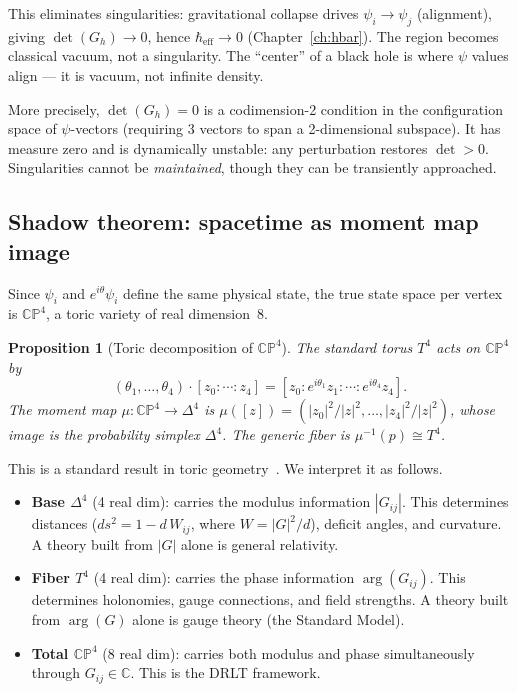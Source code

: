 \documentclass[12pt]{article}
\newtheorem{proposition}[theorem]{Proposition}
\theoremstyle{remark}
\theoremstyle{definition}
\begin{document}
This eliminates singularities: gravitational collapse drives $\psi_i \to \psi_j$ (alignment), giving $\det(G_h) \to 0$, hence $\hbar_\text{eff} \to 0$ (Chapter~\ref{ch:hbar}). The region becomes classical vacuum, not a singularity. The ``center'' of a black hole is where $\psi$ values align --- it is vacuum, not infinite density.

More precisely, $\det(G_h) = 0$ is a codimension-2 condition in the configuration space of $\psi$-vectors (requiring 3 vectors to span a 2-dimensional subspace).  It has measure zero and is dynamically unstable: any perturbation restores $\det > 0$.  Singularities cannot be \emph{maintained}, though they can be transiently approached.

\subsection{Shadow theorem: spacetime as moment map image}
\label{sec:shadow}

Since $\psi_i$ and $e^{i\theta}\psi_i$ define the same physical state, the true state space per vertex is $\mathbb{CP}^4$, a toric variety of real dimension~8.

\begin{proposition}[Toric decomposition of $\mathbb{CP}^4$]
\label{prop:toric}
The standard torus $T^4$ acts on $\mathbb{CP}^4$ by
\begin{equation}
(\theta_1,\ldots,\theta_4)\cdot[z_0:\cdots:z_4]
= [z_0 : e^{i\theta_1}z_1 : \cdots : e^{i\theta_4}z_4].
\end{equation}
The moment map $\mu: \mathbb{CP}^4 \to \Delta^4$ is $\mu([z]) = (|z_0|^2/|z|^2,\ldots,|z_4|^2/|z|^2)$, whose image is the probability simplex $\Delta^4$.  The generic fiber is $\mu^{-1}(p) \cong T^4$.
\end{proposition}

This is a standard result in toric geometry~\cite{fulton1993}.  We interpret it as follows.

\begin{itemize}
\item \textbf{Base $\Delta^4$} (4 real dim): carries the modulus information $|G_{ij}|$.  This determines distances ($ds^2 = 1 - d\,W_{ij}$, where $W = |G|^2/d$), deficit angles, and curvature.  A theory built from $|G|$ alone is general relativity.

\item \textbf{Fiber $T^4$} (4 real dim): carries the phase information $\arg(G_{ij})$.  This determines holonomies, gauge connections, and field strengths.  A theory built from $\arg(G)$ alone is gauge theory (the Standard Model).

\item \textbf{Total $\mathbb{CP}^4$} (8 real dim): carries both modulus and phase simultaneously through $G_{ij} \in \mathbb{C}$.  This is the DRLT framework.
\end{itemize}
\end{document}
